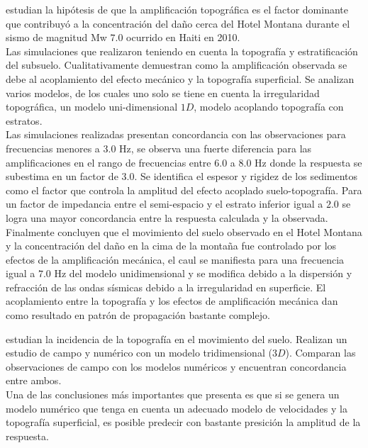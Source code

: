 \documentclass[spanish,letterpaper,12pt,twoside,openany]{article}
\begin{document}
\citep{Assimaki2013} estudian la hipótesis de que la amplificación topográfica es el factor dominante que contribuyó a la concentración del daño cerca del Hotel Montana durante el sismo de magnitud Mw $7.0$ ocurrido en Haiti en 2010.\\
%
Las simulaciones que realizaron teniendo en cuenta la topografía y estratificación del subsuelo. Cualitativamente demuestran como la amplificación observada se debe al acoplamiento del efecto mecánico y la topografía superficial. Se analizan varios modelos, de los cuales uno solo se tiene en cuenta la irregularidad topográfica, un modelo uni-dimensional $1D$, modelo acoplando topografía con estratos.\\
%
Las simulaciones realizadas presentan concordancia con las observaciones para frecuencias menores a $3.0$ Hz, se observa una fuerte diferencia para las amplificaciones en el rango de frecuencias entre $6.0$ a $8.0$ Hz donde la respuesta se subestima en un factor de $3.0$. Se identifica el espesor y rigidez de los sedimentos como el factor que controla la amplitud del efecto acoplado suelo-topografía. Para un factor de impedancia entre el semi-espacio y el estrato inferior igual a $2.0$ se logra una mayor concordancia entre la respuesta calculada y la observada.\\
%
Finalmente concluyen que el movimiento del suelo observado en el Hotel Montana y la concentración del daño en la cima de la montaña fue controlado por los efectos de la amplificación mecánica, el caul se manifiesta para una frecuencia igual a $7.0$ Hz del modelo unidimensional y se modifica debido a la dispersión y refracción de las ondas sísmicas debido a la irregularidad en superficie. El acoplamiento entre la topografía y los efectos de amplificación mecánica dan como resultado en patrón de propagación bastante complejo.

\citep{Hartzell2013} estudian la incidencia de la topografía en el movimiento del suelo. Realizan un estudio de campo y numérico con un modelo tridimensional ($3D$). Comparan las observaciones de campo con los modelos numéricos y encuentran concordancia entre ambos.\\
%
Una de las conclusiones más importantes que presenta es que si se genera un modelo numérico que tenga en cuenta un adecuado modelo de velocidades y la topografía superficial, es posible predecir con bastante presición la amplitud de la respuesta.
%
%
\end{document}
